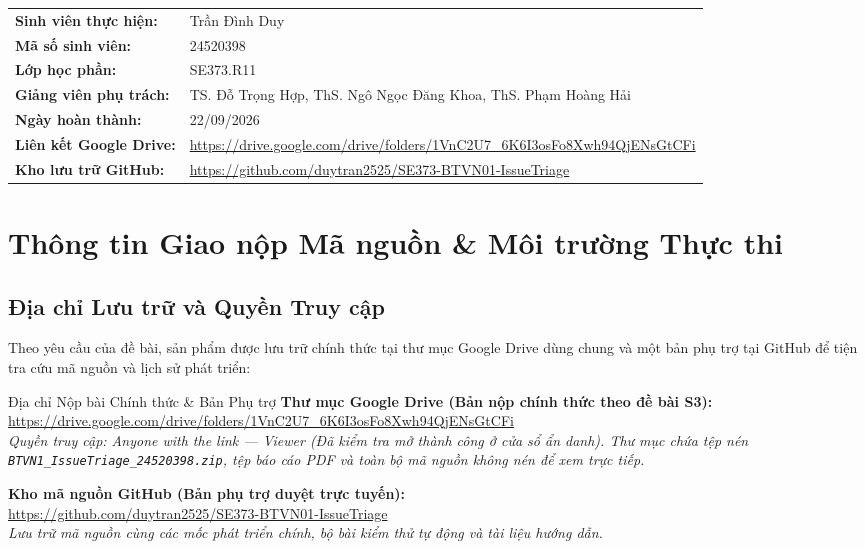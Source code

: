 \documentclass[11pt,a4paper]{article}
\begin{document}
\begin{titlepage}
  \begin{tcolorbox}[colback=lightbg, colframe=cardborder, arc=2.5mm, width=\textwidth]
    \begin{tabularx}{\textwidth}{lY}
      \textbf{Sinh viên thực hiện:} & Trần Đình Duy \\
      \textbf{Mã số sinh viên:}     & 24520398 \\
      \textbf{Lớp học phần:}        & SE373.R11 \\
      \textbf{Giảng viên phụ trách:}& TS. Đỗ Trọng Hợp, ThS. Ngô Ngọc Đăng Khoa, ThS. Phạm Hoàng Hải \\
      \textbf{Ngày hoàn thành:}     & 22/09/2026 \\
      \textbf{Liên kết Google Drive:} & \url{https://drive.google.com/drive/folders/1VnC2U7_6K6I3osFo8Xwh94QjENsGtCFi} \\
      \textbf{Kho lưu trữ GitHub:}  & \url{https://github.com/duytran2525/SE373-BTVN01-IssueTriage}
    \end{tabularx}
  \end{tcolorbox}
  \vspace{0.3cm}
\end{titlepage}

\newpage
{
  \hypersetup{linkcolor=darkslate}
  \tableofcontents
}
\newpage

\section{Thông tin Giao nộp Mã nguồn \& Môi trường Thực thi}

\subsection{Địa chỉ Lưu trữ và Quyền Truy cập}

Theo yêu cầu của đề bài, sản phẩm được lưu trữ chính thức tại thư mục Google Drive dùng chung và một bản phụ trợ tại GitHub để tiện tra cứu mã nguồn và lịch sử phát triển:

\begin{calloutbox}[secondary]{Địa chỉ Nộp bài Chính thức \& Bản Phụ trợ}
  \textbf{Thư mục Google Drive (Bản nộp chính thức theo đề bài S3):}\\
  \url{https://drive.google.com/drive/folders/1VnC2U7_6K6I3osFo8Xwh94QjENsGtCFi}\\
  \small\textit{Quyền truy cập: Anyone with the link --- Viewer (Đã kiểm tra mở thành công ở cửa sổ ẩn danh). Thư mục chứa tệp nén \texttt{BTVN1\_IssueTriage\_24520398.zip}, tệp báo cáo PDF và toàn bộ mã nguồn không nén để xem trực tiếp.}\par
  \vspace{0.3em}
  \textbf{Kho mã nguồn GitHub (Bản phụ trợ duyệt trực tuyến):}\\
  \url{https://github.com/duytran2525/SE373-BTVN01-IssueTriage}\\
  \small\textit{Lưu trữ mã nguồn cùng các mốc phát triển chính, bộ bài kiểm thử tự động và tài liệu hướng dẫn.}
\end{calloutbox}
\end{document}
